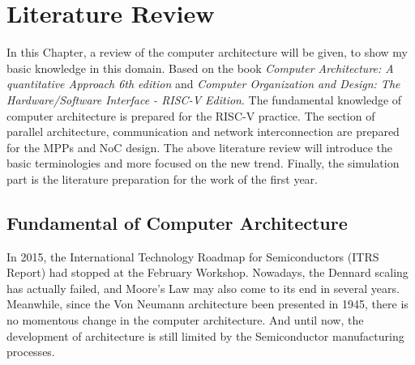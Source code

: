 \chapter{Literature Review}

In this Chapter, a review of the computer architecture will be given, to show my basic knowledge in this domain. Based on the book \textit{Computer Architecture: A quantitative Approach 6th edition}\cite{hennessy2017computer} and \textit{Computer Organization and Design: The Hardware/Software Interface - RISC-V Edition}\cite{patterson2017computer}. The fundamental knowledge of computer architecture is prepared for the RISC-V practice. The section of parallel architecture, communication and network interconnection are prepared for the MPPs and NoC design. The above literature review will introduce the basic terminologies and more focused on the new trend. Finally, the simulation part is the literature preparation for the work of the first year.

\section{Fundamental of Computer Architecture}
In 2015, the International Technology Roadmap for Semiconductors (ITRS Report) had stopped at the February Workshop\cite{ceze2016arch2030}\cite{ITRS2015}. Nowadays, the Dennard scaling has actually failed\cite{hennessy2017computer}, and Moore's Law may also come to its end in several years\cite{chien2013moore}\cite{courtland2016transistors}\cite{national2011future}.  Meanwhile, since the Von Neumann architecture\cite{von1993first} been presented in 1945, there is no momentous change in the computer architecture. And until now, the development of architecture is still limited by the Semiconductor manufacturing processes.

